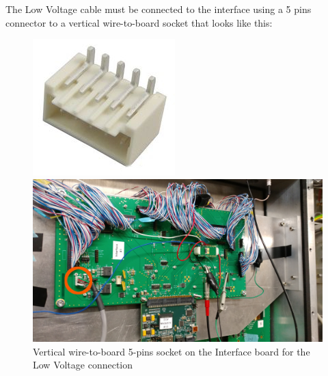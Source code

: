 The Low Voltage cable must be connected to the interface using a 5
pins connector to a vertical wire-to-board socket that looks like
this:
\begin{figure}[H]
\centering
\begin{minipage}{0.2\linewidth}
  \centering
  \includegraphics[width=\linewidth,frame]{low-vol-socket1}
\end{minipage}%
\begin{minipage}{0.8\linewidth}
  \centering
  \includegraphics[width=0.9\linewidth,frame]{low-vol-socket2}
\end{minipage}
\caption{Vertical wire-to-board 5-pins socket on the Interface board
  for the Low Voltage connection}\label{low-vol-socket}
\end{figure}
